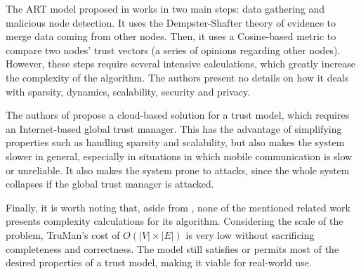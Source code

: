 \documentclass[conference]{IEEEtran}
\begin{document}
The ART model proposed in \cite{li2016art} works in two main steps: data gathering and malicious node detection.
It uses the Dempster-Shafter theory of evidence to merge data coming from other nodes.
Then, it uses a Cosine-based metric to compare two nodes' trust vectors (a series of opinions regarding other nodes).
However, these steps require several intensive calculations, which greatly increase the complexity of the algorithm.
The authors present no details on how it deals with sparsity, dynamics, scalability, security and privacy.

The authors of \cite{chen2017cloud} propose a cloud-based solution for a trust model, which requires an Internet-based global trust manager.
This has the advantage of simplifying properties such as handling sparsity and scalability, but also makes the system slower in general, especially in situations in which mobile communication is slow or unreliable.
It also makes the system prone to attacks, since the whole system collapses if the global trust manager is attacked.

Finally, it is worth noting that, aside from \cite{vernize2015malicious}, none of the mentioned related work presents complexity calculations for its algorithm.
Considering the scale of the problem, TruMan's cost of $O(|V|\times |E|)$ is very low without sacrificing completeness and correctness.
The model still satisfies or permits most of the desired properties of a trust model, making it viable for real-world use.

%
\end{document}
